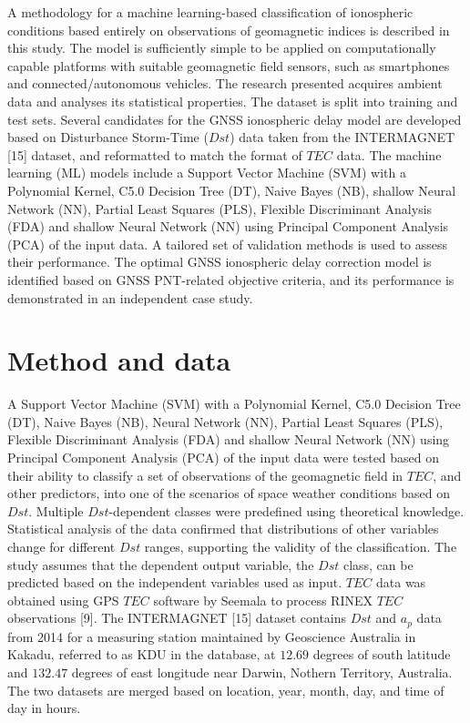 \let\LaTeXcline\cline\documentclass[sn-mathphys-num]{sn-jnl}\let\cline\LaTeXcline
\begin{document}
A methodology for a machine learning-based classification of ionospheric conditions based entirely on observations of geomagnetic indices is described in this study. The model is sufficiently simple to be applied on computationally capable platforms with suitable geomagnetic field sensors, such as smartphones and connected/autonomous vehicles. The research presented acquires ambient data and analyses its statistical properties. The dataset is split into training and test sets. Several candidates for the GNSS ionospheric delay model are developed based on Disturbance Storm-Time ($Dst$) data taken from the INTERMAGNET [15] dataset, and reformatted to match the format of $TEC$ data. The machine learning (ML) models include a Support Vector Machine (SVM) with a Polynomial Kernel, C5.0 Decision Tree (DT), Naive Bayes (NB), shallow Neural Network (NN), Partial Least Squares (PLS), Flexible Discriminant Analysis (FDA) and shallow Neural Network (NN) using Principal Component Analysis (PCA) of the input data. A tailored set of validation methods is used to assess their performance. The optimal GNSS ionospheric delay correction model is identified based on GNSS PNT-related objective criteria, and its performance is demonstrated in an independent case study.

\section{Method and data}
\label{sec:Dataset}

A Support Vector Machine (SVM) with a Polynomial Kernel, C5.0 Decision Tree (DT), Naive Bayes (NB), Neural Network (NN), Partial Least Squares (PLS), Flexible Discriminant Analysis (FDA) and shallow Neural Network (NN) using Principal Component Analysis (PCA) of the input data were tested based on their ability to classify a set of observations of the geomagnetic field in $TEC$, and other predictors, into one of the scenarios of space weather conditions based on $Dst$. Multiple $Dst$-dependent classes were predefined using theoretical knowledge. Statistical analysis of the data confirmed that distributions of other variables change for different $Dst$ ranges, supporting the validity of the classification. The study assumes that the dependent output variable, the $Dst$ class, can be predicted based on the independent variables used as input. $TEC$ data was obtained using GPS $TEC$ software by Seemala to process RINEX $TEC$ observations [9]. The INTERMAGNET [15] dataset contains $Dst$ and $a_{p}$ data from 2014 for a measuring station maintained by Geoscience Australia in Kakadu, referred to as KDU in the database, at $12.69$ degrees of south latitude and $132.47$ degrees of east longitude near Darwin, Nothern Territory, Australia. The two datasets are merged based on location, year, month, day, and time of day in hours.
\end{document}
